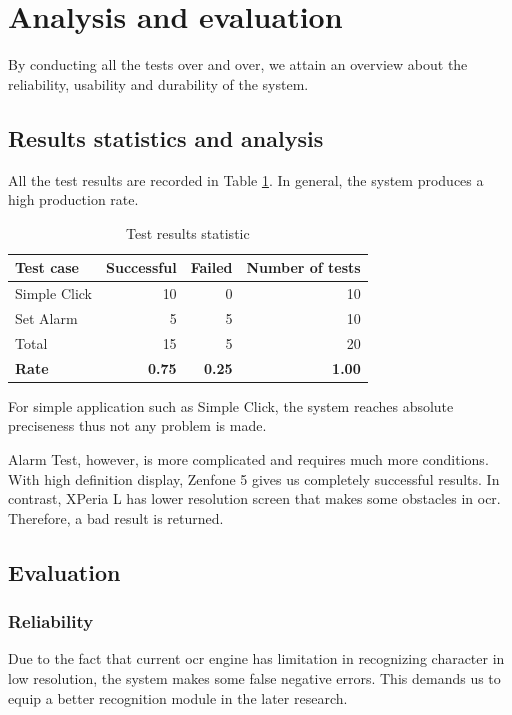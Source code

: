 \section{Analysis and evaluation}
By conducting all the tests over and over, we attain an overview about the reliability, usability and durability of the system.

\subsection{Results statistics and analysis}
All the test results are recorded in Table \ref{tab:result_stat}. In general, the system produces a high production rate.

	\begin{table}[H]
		\centering
		\caption{Test results statistic}	
		\label{tab:result_stat}
		\begin{tabular}{|l|rrr|}
			\hline
			Test case & Successful & Failed & Number of tests \\
			\hline
			Simple Click & 10 & 0 & 10 \\
			Set Alarm & 5 & 5 & 10 \\
			\hline
			Total & 15 & 5 & 20 \\
			\hline
			\textbf{Rate} & \textbf{0.75} & \textbf{0.25} & \textbf{1.00} \\
			\hline
		\end{tabular}
	\end{table}

For simple application such as Simple Click, the system reaches absolute preciseness thus not any problem is made.

Alarm Test, however, is more complicated and requires much more conditions. With high definition display, Zenfone 5 gives us completely successful results. In contrast, XPeria L has lower resolution screen that makes some obstacles in \acrshort{ocr}. Therefore, a bad result is returned.

\subsection{Evaluation}
\subsubsection{Reliability}
Due to the fact that current \acrshort{ocr} engine has limitation in recognizing character in low resolution, the system makes some false negative errors. This demands us to equip a better recognition module in the later research.


